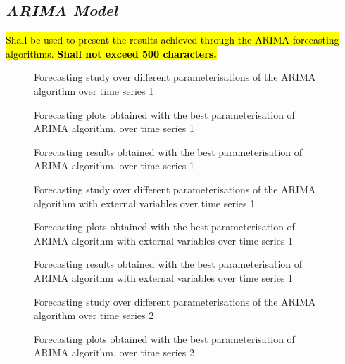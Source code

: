 \documentclass[10pt]{extarticle}
\newcommand{\ctext}[3][RGB]{%
  \begingroup
  \definecolor{hlcolor}{#1}{#2}\sethlcolor{hlcolor}%
  \hl{#3}%
  \endgroup
}
\begin{document}
\subsection*{\textit{ARIMA Model}}
\ctext[RGB]{190,190,190}{Shall be used to present the results achieved through the ARIMA forecasting algorithms.  \textbf{Shall not exceed 500 characters.}}

\begin{figure}[H]
\caption{Forecasting study over different parameterisations of the ARIMA algorithm over time series 1}
\end{figure}

\begin{figure}[H]
\caption{Forecasting plots obtained with the best parameterisation of ARIMA algorithm, over time series 1}
\end{figure}

\begin{figure}[H]
\caption{Forecasting results obtained with the best parameterisation of ARIMA algorithm, over time series 1}
\end{figure}

\begin{figure}[H]
\caption{Forecasting study over different parameterisations of the ARIMA algorithm with external variables over time series 1}
\end{figure}

\begin{figure}[H]
\caption{Forecasting plots obtained with the best parameterisation of ARIMA algorithm with external variables over time series 1}
\end{figure}

\begin{figure}[H]
\caption{Forecasting results obtained with the best parameterisation of ARIMA algorithm with external variables over time series 1}
\end{figure}

\begin{figure}[H]
\caption{Forecasting study over different parameterisations of the ARIMA algorithm over time series 2}
\end{figure}

\begin{figure}[H]
\caption{Forecasting plots obtained with the best parameterisation of ARIMA algorithm, over time series 2}
\end{figure}
\end{document}
